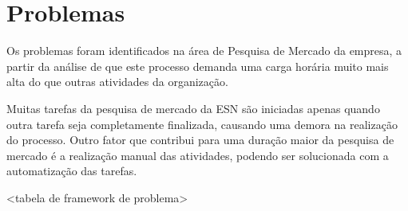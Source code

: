 \section{Problemas}

	Os problemas foram identificados na área de Pesquisa de Mercado da empresa, a partir da análise de que este processo demanda uma carga horária muito mais alta do que outras atividades da organização.

	Muitas tarefas da pesquisa de mercado da ESN são iniciadas apenas quando outra tarefa seja completamente finalizada, causando uma demora na realização do processo. Outro fator que contribui para uma duração maior da pesquisa de mercado é a realização manual das atividades, podendo ser solucionada com a automatização das 	tarefas.


	<tabela de framework de problema>